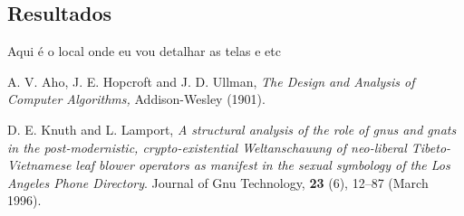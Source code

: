 \documentclass[11pt,twoside]{article}
\begin{document}
\subsection{Resultados}

Aqui é o local onde eu vou detalhar as telas e etc


\begin{thebibliography}{99}

 A. V. Aho, J. E. Hopcroft and J.  D.  Ullman, {\it The
Design and Analysis of Computer Algorithms,} Addison-Wesley (1901).

 D. E. Knuth and L. Lamport, {\it A structural analysis
of the role of gnus and gnats in the post-modernistic, crypto-existential 
Weltanschauung of neo-liberal Tibeto-Vietnamese leaf blower operators 
as manifest in the sexual symbology of the Los Angeles Phone Directory}.
Journal of Gnu Technology, {\bf 23} (6), 12--87
(March 1996).

\end{thebibliography}
\end{document}
